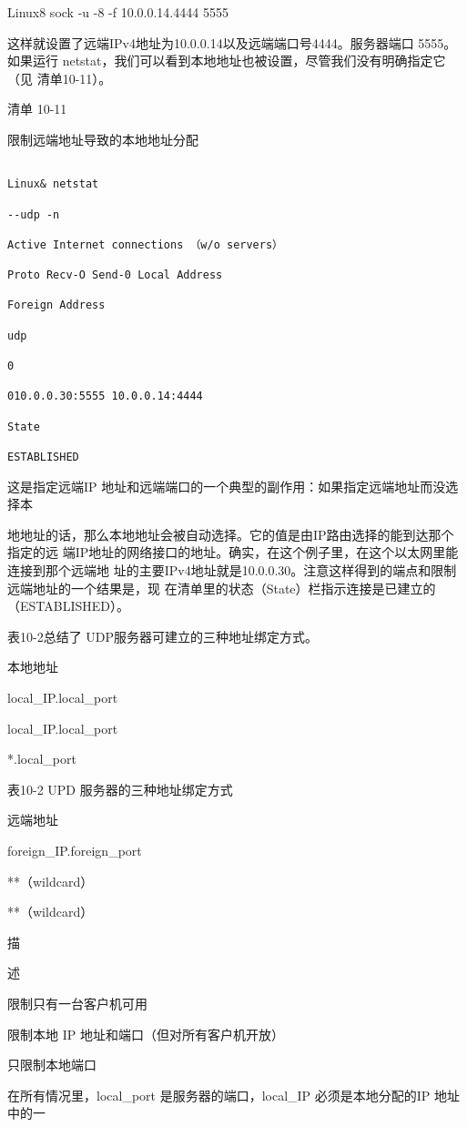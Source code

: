 Linux8 sock -u -8 -f 10.0.0.14.4444 5555

这样就设置了远端IPv4地址为10.0.0.14以及远端端口号4444。服务器端口
5555。如果运行 netstat，我们可以看到本地地址也被设置，尽管我们没有明确指定它（见
清单10-11）。

清单 10-11

限制远端地址导致的本地地址分配

\begin{verbatim}
    
Linux& netstat

--udp -n

Active Internet connections （w/o servers）

Proto Recv-O Send-0 Local Address

Foreign Address

udp

0

010.0.0.30:5555 10.0.0.14:4444

State

ESTABLISHED
\end{verbatim}

这是指定远端IP 地址和远端端口的一个典型的副作用：如果指定远端地址而没选择本

地地址的话，那么本地地址会被自动选择。它的值是由IP路由选择的能到达那个指定的远
端IP地址的网络接口的地址。确实，在这个例子里，在这个以太网里能连接到那个远端地
址的主要IPv4地址就是10.0.0.30。注意这样得到的端点和限制远端地址的一个结果是，现
在清单里的状态（State）栏指示连接是已建立的（ESTABLISHED）。

表10-2总结了 UDP服务器可建立的三种地址绑定方式。

本地地址

local\_IP.local\_port

local\_IP.local\_port

*.local\_port

表10-2 UPD 服务器的三种地址绑定方式

远端地址

foreign\_IP.foreign\_port

**（wildcard）

**（wildcard）

描

述

限制只有一台客户机可用

限制本地 IP 地址和端口（但对所有客户机开放）

只限制本地端口

在所有情况里，local\_port 是服务器的端口，local\_IP 必须是本地分配的IP 地址中的一

